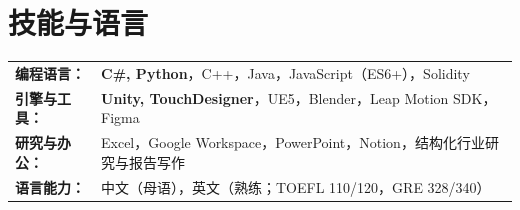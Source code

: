 \documentclass[a4paper,12pt]{article}
\begin{document}
\section{技能与语言}
\begin{tabularx}{\linewidth}{@{}l X@{}}
\textbf{编程语言：} & \textbf{C\#, Python}，C++，Java，JavaScript（ES6+），Solidity \\
\textbf{引擎与工具：} & \textbf{Unity, TouchDesigner}，UE5，Blender，Leap Motion SDK，Figma \\
\textbf{研究与办公：} & Excel，Google Workspace，PowerPoint，Notion，结构化行业研究与报告写作 \\
\textbf{语言能力：} & 中文（母语），英文（熟练；TOEFL 110/120，GRE 328/340） \\
\end{tabularx}
\end{document}
